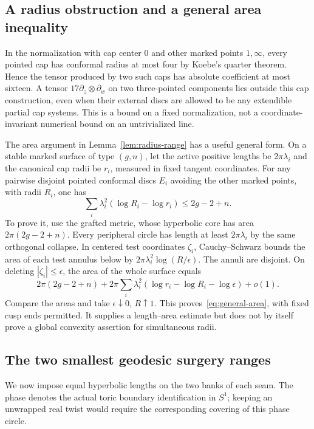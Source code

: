 \documentclass[11pt,a4paper]{article}
\theoremstyle{definition}
\begin{document}
\subsection{A radius obstruction and a general area inequality}
In the normalization with cap center $0$ and other marked points $1,\infty$, every pointed cap has conformal radius at most four by Koebe's quarter theorem. Hence the tensor produced by two such caps has absolute coefficient at most sixteen. A tensor $17\partial_z\otimes\partial_w$ on two three-pointed components lies outside this cap construction, even when their external discs are allowed to be any extendible partial cap systems. This is a bound on a fixed normalization, not a coordinate-invariant numerical bound on an untrivialized line.

The area argument in Lemma~\ref{lem:radius-range} has a useful general form. On a stable marked surface of type $(g,n)$, let the active positive lengths be $2\pi\lambda_i$ and the canonical cap radii be $r_i$, measured in fixed tangent coordinates. For any pairwise disjoint pointed conformal discs $E_i$ avoiding the other marked points, with radii $R_i$, one has
\begin{equation}\label{eq:general-area}
 \sum_i\lambda_i^2(\log R_i-\log r_i)\le2g-2+n.
\end{equation}
To prove it, use the grafted metric, whose hyperbolic core has area $2\pi(2g-2+n)$. Every peripheral circle has length at least $2\pi\lambda_i$ by the same orthogonal collapse. In centered test coordinates $\zeta_i$, Cauchy--Schwarz bounds the area of each test annulus below by $2\pi\lambda_i^2\log(R/\epsilon)$. The annuli are disjoint. On deleting $|\zeta_i|\le\epsilon$, the area of the whole surface equals
\[
 2\pi(2g-2+n)+2\pi\sum_i\lambda_i^2
   (\log r_i-\log R_i-\log\epsilon)+o(1).
\]
Compare the areas and take $\epsilon\downarrow0$, $R\uparrow1$. This proves~\eqref{eq:general-area}, with fixed cusp ends permitted. It supplies a length--area estimate but does not by itself prove a global convexity assertion for simultaneous radii.

\subsection{The two smallest geodesic surgery ranges}
We now impose equal hyperbolic lengths on the two banks of each seam. The phase denotes the actual toric boundary identification in $S^1$; keeping an unwrapped real twist would require the corresponding covering of this phase circle.
\end{document}
